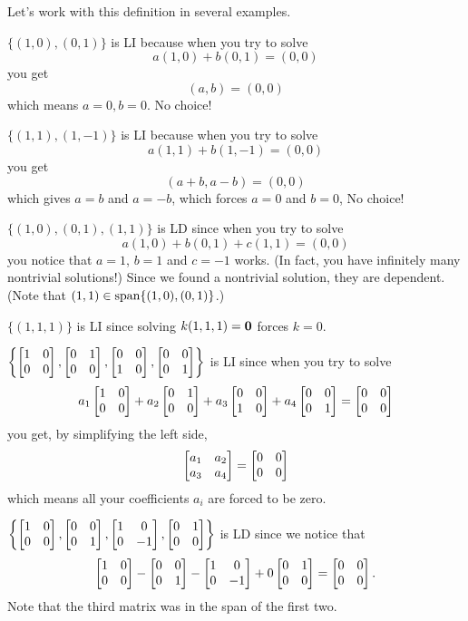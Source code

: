 Let's work with this definition in several examples.

\begin{myexample}\label{R2} $\{(1,0), (0,1)\}$ is LI because when you try to solve 
$$
a(1,0)+b(0,1) = (0,0)
$$
you get 
$$
(a,b) = (0,0)
$$
which means $a=0, b=0$.  No choice! \end{myexample}

\begin{myexample} $\{(1,1), (1,-1)\}$ is LI because when you try to solve
$$
a(1,1)+b(1,-1) = (0,0)
$$
you get
$$
(a+b,a-b)= (0,0)
$$
which gives $a=b$ and $a=-b$, which forces $a=0$ and $b=0$,  No choice! \end{myexample}

\begin{myexample} $\{(1,0), (0,1), (1,1)\}$ is LD since
when you try to solve
$$
a(1,0) + b(0,1) + c(1,1) = (0,0)
$$
you notice that $a=1$, $b=1$ and $c=-1$ works.  (In fact, you have
infinitely many nontrivial solutions!)  Since we found a nontrivial
solution, they are dependent.  (Note that $(1,1) \in \textrm{span}\{(1,0),(0,1)\}$.)
\end{myexample}

\begin{myexample} $\{ (1,1,1)\}$ is LI since solving $k(1,1,1)=\mathbf{0}$ forces $k=0$. \end{myexample}

\begin{myexample} $\left\{ \left[ \begin{matrix} 1&0\\0&0 \end{matrix} \right], \left[ \begin{matrix} 0&1\\0&0 \end{matrix} \right],  \left[ \begin{matrix} 0&0\\1&0 \end{matrix} \right], \left[ \begin{matrix} 0&0\\0&1 \end{matrix} \right] \right\}$ is LI since when you try to solve
$$
a_1\left[ \begin{matrix} 1&0\\0&0 \end{matrix} \right]+a_2\left[ \begin{matrix} 0&1\\0&0 \end{matrix} \right]+a_3\left[ \begin{matrix} 0&0\\1&0 \end{matrix} \right]+a_4 \left[ \begin{matrix} 0&0\\0&1 \end{matrix} \right] =
 \left[ \begin{matrix} 0&0\\0&0 \end{matrix} \right]
$$
you get, by simplifying the left side,
$$
\left[ \begin{matrix} a_1 & a_2 \\ a_3 & a_4 \end{matrix} \right] =  \left[ \begin{matrix} 0&0\\0&0 \end{matrix} \right]
$$
which means all your coefficients $a_i$ are forced to be zero.\end{myexample}

\begin{myexample}  $\left\{ \left[ \begin{matrix} 1&0\\0&0 \end{matrix} \right], \left[ \begin{matrix} 0&0\\0&1 \end{matrix} \right],  \left[ \begin{matrix} 1&0\\0&-1 \end{matrix} \right], \left[ \begin{matrix} 0&1\\0&0 \end{matrix} \right] \right\}$ is LD since we notice that
$$
\left[ \begin{matrix} 1&0\\0&0 \end{matrix} \right] - \left[ \begin{matrix} 0&0\\0&1 \end{matrix} \right] - \left[ \begin{matrix} 1&0\\0&-1 \end{matrix} \right] + 0\left[ \begin{matrix} 0&1\\0&0 \end{matrix} \right] = \left[ \begin{matrix} 0&0\\0&0 \end{matrix} \right].
$$
Note that the third matrix was in the span of the first two. \end{myexample}

